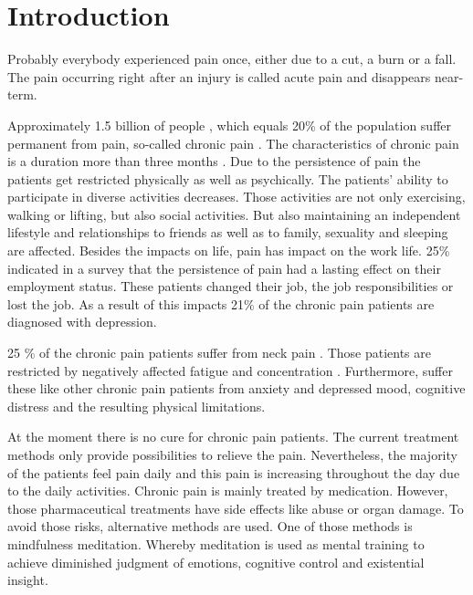 \chapter{Introduction}

Probably everybody experienced pain once, either due to a cut, a burn or a fall. The pain occurring right after an injury is called acute pain and disappears near-term. \cite{Briggs2010;Mello2016}

Approximately 1.5 billion of people \cite{Zeidan2016}, which equals 20\% of the population suffer permanent from pain, so-called chronic pain \cite{Macfarlanea2016}. The characteristics of chronic pain is a duration more than three months \cite{Mello2016}. Due to the persistence of pain the patients get restricted physically as well as psychically. 
The patients' ability to participate in diverse activities decreases. Those activities are not only exercising, walking or lifting, but also social activities. But also maintaining an independent lifestyle and relationships to friends as well as to family, sexuality and sleeping are affected. Besides the impacts on life, pain has impact on the work life. 25\% indicated in a survey that the persistence of pain had a lasting effect on their employment status. These patients changed their job, the job responsibilities or lost the job. 
As a result of this impacts 21\% of the chronic pain patients are diagnosed with depression. \cite{Breivik2006}

25 \% of the chronic pain patients suffer from neck pain \cite{Macfarlanea2016}. Those patients are restricted by negatively affected fatigue and concentration \cite{vanRanderaat2016}. Furthermore, suffer these like other chronic pain patients from anxiety and depressed mood, cognitive distress and the resulting physical limitations. \cite{gross2013}

At the moment there is no cure for chronic pain patients. The current treatment methods only provide possibilities to relieve the pain. \cite{marcus2009;pope2017} Nevertheless, the majority of the patients feel pain daily and this pain is increasing throughout the day due to the daily activities. \cite{Breivik2006}
Chronic pain is mainly treated by medication. However, those pharmaceutical treatments have side effects like abuse or organ damage. To avoid those risks, alternative methods are used. One of those methods is mindfulness meditation. Whereby meditation is used as mental training to achieve diminished judgment of emotions, cognitive control and existential insight. \cite{zeidan2012}


